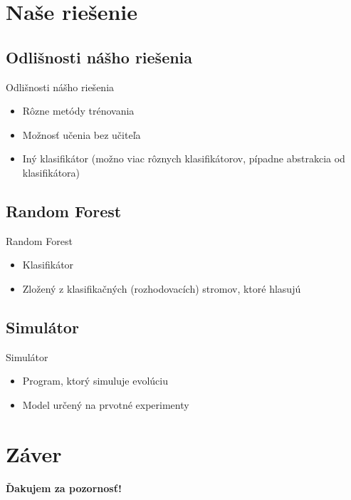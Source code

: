 \documentclass[xcolor=dvipsnames, compress, 12pt]{beamer}
\begin{document}
\section{Naše riešenie}
\subsection{Odlišnosti nášho riešenia}
\begin{frame}{Odlišnosti nášho riešenia}
  \begin{itemize}
    \item Rôzne metódy trénovania
    \item Možnosť učenia bez učiteľa
    \item Iný klasifikátor (možno viac rôznych klasifikátorov, pípadne abstrakcia od klasifikátora)
  \end{itemize} 
\end{frame}

\subsection{Random Forest}
\begin{frame}{Random Forest}
  \begin{itemize}
    \item Klasifikátor
    \item Zložený z klasifikačných (rozhodovacích) stromov, ktoré hlasujú
  \end{itemize} 
\end{frame}

\subsection{Simulátor}
\begin{frame}{Simulátor}
  \begin{itemize}
    \item Program, ktorý simuluje evolúciu
    \item Model určený na prvotné experimenty
  \end{itemize} 
\end{frame}

\section{Záver}
\begin{frame}{}
  \begin{center}
  \textbf{\color{Green} \LARGE Ďakujem za pozornosť!} 
  \end{center}  
\end{frame}
\end{document}
